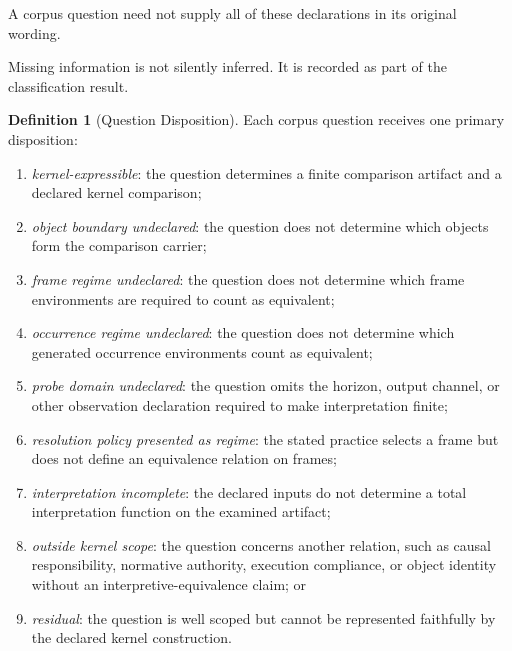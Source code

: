 \documentclass[11pt]{article}
\theoremstyle{plain}
\theoremstyle{definition}
\newtheorem{definition}[theorem]{Definition}
\theoremstyle{remark}
\begin{document}
A corpus question need not supply
all of these declarations in its original wording.

Missing information is not silently inferred.
It is recorded as part of the classification result.

\begin{definition}[Question Disposition]
  \label{ik.def.question-disposition}
  Each corpus question receives
  one primary disposition:
  \begin{enumerate}[label=(D\arabic*)]
    \item \emph{kernel-expressible}:
          the question determines
          a finite comparison artifact
          and a declared kernel comparison;

    \item \emph{object boundary undeclared}:
          the question does not determine
          which objects form the comparison carrier;

    \item \emph{frame regime undeclared}:
          the question does not determine
          which frame environments
          are required to count as equivalent;

    \item \emph{occurrence regime undeclared}:
          the question does not determine
          which generated occurrence environments
          count as equivalent;

    \item \emph{probe domain undeclared}:
          the question omits
          the horizon,
          output channel,
          or other observation declaration
          required to make interpretation finite;

    \item \emph{resolution policy presented as regime}:
          the stated practice selects a frame
          but does not define
          an equivalence relation on frames;

    \item \emph{interpretation incomplete}:
          the declared inputs do not determine
          a total interpretation function
          on the examined artifact;

    \item \emph{outside kernel scope}:
          the question concerns another relation,
          such as causal responsibility,
          normative authority,
          execution compliance,
          or object identity
          without an interpretive-equivalence claim; or

    \item \emph{residual}:
          the question is well scoped
          but cannot be represented faithfully
          by the declared kernel construction.
  \end{enumerate}
\end{definition}
\end{document}
